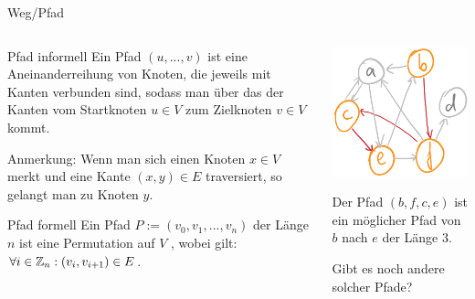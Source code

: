 \begin{frame}{Weg/Pfad}
	\begin{columns}
		\begin{column}{0.6\textwidth}
			\begin{block}{Pfad informell}
				Ein Pfad $(u,...,v)$ ist eine Aneinanderreihung von Knoten\ip, die jeweils mit Kanten verbunden sind\ip, sodass man über das  der Kanten vom Startknoten $u\in V$ zum Zielknoten $v\in V$ kommt.
			\end{block}
			
			\bp
			Anmerkung: Wenn man sich einen Knoten $x \in V$ merkt und eine Kante $(x,y) \in E$ traversiert, so gelangt man zu Knoten $y$.
			\bp
			
			\begin{block}{Pfad formell}
				Ein Pfad $P := (v_0, v_1, ..., v_n)$ der Länge $n$ \ip ist eine Permutation auf $V$ \ip, wobei gilt: \ip $\forall i \in \mathbb{Z}_n: (v_i, v_{i+1}) \in E$.
			\end{block}	
		\end{column}
		
		\begin{column}{0.4\textwidth}
			\bp
			\includegraphics[scale=0.3]{images/graph_pfad.png}
			
			\ip Der Pfad $(b,f,c,e)$ ist ein möglicher Pfad von $b$ nach $e$ der Länge 3.
			
			\ip Gibt es noch andere solcher Pfade?
		\end{column}
	\end{columns}
\end{frame}

